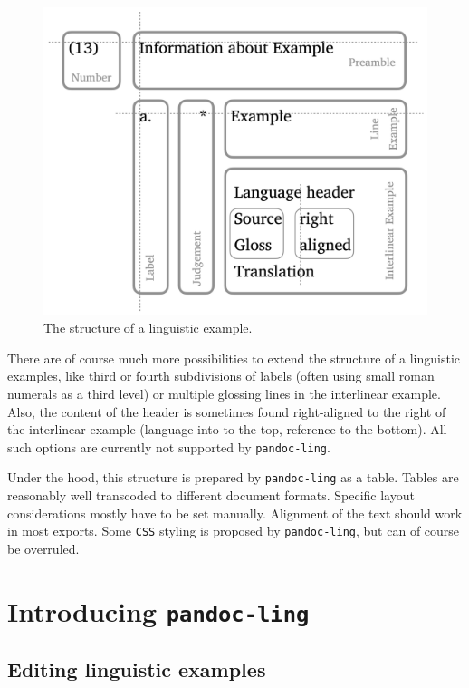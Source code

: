 \documentclass[
]{article}
\begin{document}
\begin{figure}
\centering
\includegraphics{ExampleStructure.png}
\caption{The structure of a linguistic example.}
\end{figure}

There are of course much more possibilities to extend the structure of a
linguistic examples, like third or fourth subdivisions of labels (often
using small roman numerals as a third level) or multiple glossing lines
in the interlinear example. Also, the content of the header is sometimes
found right-aligned to the right of the interlinear example (language
into to the top, reference to the bottom). All such options are
currently not supported by \texttt{pandoc-ling}.

Under the hood, this structure is prepared by \texttt{pandoc-ling} as a
table. Tables are reasonably well transcoded to different document
formats. Specific layout considerations mostly have to be set manually.
Alignment of the text should work in most exports. Some \texttt{CSS}
styling is proposed by \texttt{pandoc-ling}, but can of course be
overruled.

\hypertarget{introducing-pandoc-ling}{%
\section{\texorpdfstring{Introducing
\texttt{pandoc-ling}}{Introducing pandoc-ling}}\label{introducing-pandoc-ling}}

\hypertarget{editing-linguistic-examples}{%
\subsection{Editing linguistic
examples}\label{editing-linguistic-examples}}
\end{document}
